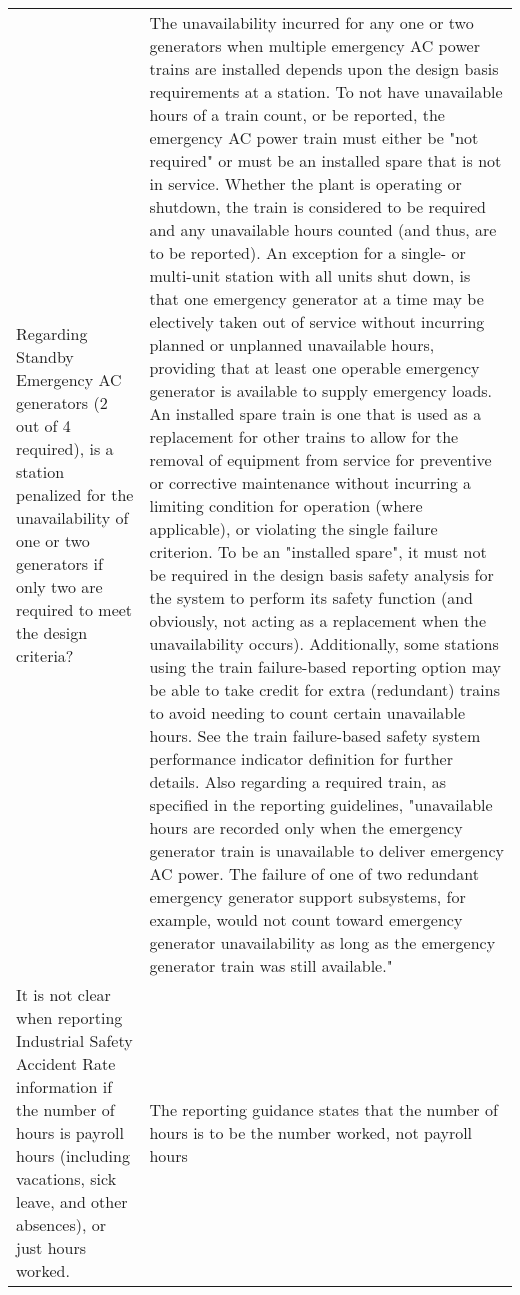 \begin{longtable}{p{7cm}p{7cm}}
    Regarding Standby Emergency AC generators (2 out of 4 required),
  is a station penalized for the unavailability of one or two
  generators if only two are required to meet the design criteria?
& The unavailability incurred for any one or two generators when
  multiple emergency AC power trains are installed depends upon the
  design basis requirements at a station. To not have unavailable
  hours of a train count, or be reported, the emergency AC power train
  must either be "not required" or must be an installed spare that is
  not in service. Whether the plant is operating or shutdown, the
  train is considered to be required and any unavailable hours counted
  (and thus, are to be reported).  An exception for a single- or
  multi-unit station with all units shut down, is that one emergency
  generator at a time may be electively taken out of service without
  incurring planned or unplanned unavailable hours, providing that at
  least one operable emergency generator is available to supply
  emergency loads.
    An installed spare train is one that is used as a replacement for
  other trains to allow for the removal of equipment from service for
  preventive or corrective maintenance without incurring a limiting
  condition for operation (where applicable), or violating the single
  failure criterion. To be an "installed spare", it must not be
  required in the design basis safety analysis for the system to
  perform its safety function (and obviously, not acting as a
  replacement when the unavailability occurs). Additionally, some
  stations using the train failure-based reporting option may be able
  to take credit for extra (redundant) trains to avoid needing to
  count certain unavailable hours. See the train failure-based safety
  system performance indicator definition for further details.
    Also regarding a required train, as specified in the reporting
  guidelines, "unavailable hours are recorded only when the emergency
  generator train is unavailable to deliver emergency AC power. The
  failure of one of two redundant emergency generator support
  subsystems, for example, would not count toward emergency generator
  unavailability as long as the emergency generator train was still
  available."\\

    It is not clear when reporting Industrial Safety Accident Rate
  information if the number of hours is payroll hours (including
  vacations, sick leave, and other absences), or just hours worked.
& The reporting guidance states that the number of hours is to be the
  number worked, not payroll hours\\


\end{longtable}
